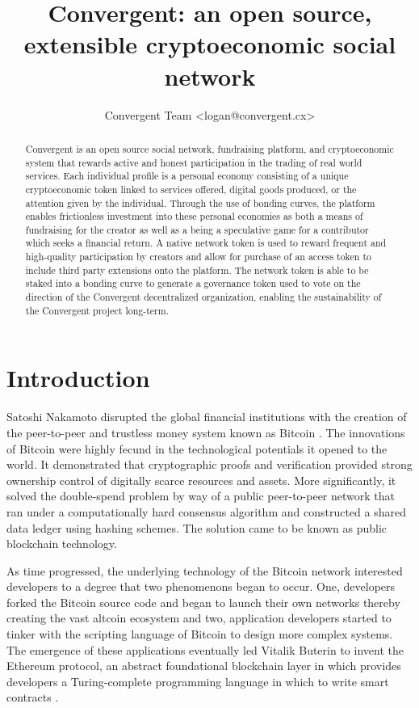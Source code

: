 \documentclass[a4paper]{article}
\title{Convergent: an open source, extensible cryptoeconomic social network}
\author{Convergent Team <logan@convergent.cx>}
\begin{document}
\maketitle

\begin{abstract}
Convergent is an open source social network, fundraising platform, and cryptoeconomic system that rewards active and honest participation in the trading of real world services. Each individual profile is a personal economy consisting of a unique cryptoeconomic token linked to services offered, digital goods produced, or the attention given by the individual. Through the use of bonding curves, the platform enables frictionless investment into these personal economies as both a means of fundraising for the creator as well as a being a speculative game for a contributor which seeks a financial return. A native network token is used to reward frequent and high-quality participation by creators and allow for purchase of an access token to include third party extensions onto the platform. The network token is able to be staked into a bonding curve to generate a governance token used to vote on the direction of the Convergent decentralized organization, enabling the sustainability of the Convergent project long-term.
\end{abstract}

\section{Introduction}

Satoshi Nakamoto disrupted the global financial institutions with the creation of the peer-to-peer and trustless money system known as Bitcoin \cite{bitcoin}. The innovations of Bitcoin were highly fecund in the technological potentials it opened to the world. It demonstrated that cryptographic proofs and verification provided strong ownership control of digitally scarce resources and assets. More significantly, it solved the double-spend problem by way of a public peer-to-peer network that ran under a computationally hard consensus algorithm and constructed a shared data ledger using hashing schemes. The solution came to be known as public blockchain technology. 

	As time progressed, the underlying technology of the Bitcoin network interested developers to a degree that two phenomenons began to occur. One, developers forked the Bitcoin source code and began to launch their own networks thereby creating the vast altcoin ecosystem and two, application developers started to tinker with the scripting language of Bitcoin to design more complex systems. The emergence of these applications eventually led Vitalik Buterin to invent the Ethereum protocol, an abstract foundational blockchain layer in which provides developers a Turing-complete programming language in which to write smart contracts \cite{ethereum}.
    
\end{document}
